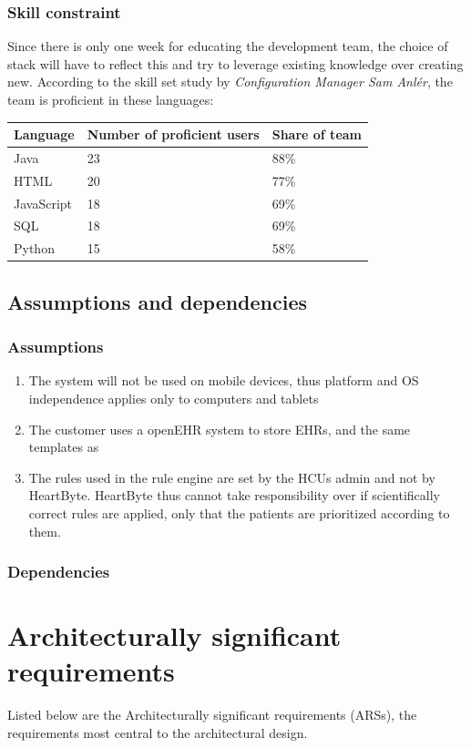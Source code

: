 \documentclass{article}
\begin{document}
\subsubsection{Skill constraint}
Since there is only one week for educating the development team, the choice of stack will have to reflect this and try to leverage existing knowledge over creating new. According to the skill set study by \emph{Configuration Manager Sam Anlér}, the team is proficient in these languages:

\begin{table}[h]
\centering
\begin{tabular}{|l|l|l|}
\hline
Language & Number of proficient users & Share of team \\ \hline
Java & 23 & 88\% \\
HTML & 20 & 77\% \\ 
JavaScript & 18 & 69\% \\ 
SQL & 18 & 69\% \\ 
Python & 15 & 58\% \\ 
\hline
\end{tabular}
\end{table}



\subsection{Assumptions and dependencies}
\subsubsection{Assumptions}
\begin{enumerate}[label=(\roman*)]
\item The system will not be used on mobile devices, thus platform and OS independence applies only to computers and tablets 
\item The customer uses a openEHR system to store EHRs, and the same templates as 
\item The rules used in the rule engine are set by the HCUs admin and not by HeartByte. HeartByte thus cannot take responsibility over if scientifically correct rules are applied, only that the patients are prioritized according to them.
\end{enumerate}
\subsubsection{Dependencies}


\section{Architecturally significant requirements}
Listed below are the Architecturally significant requirements (ARSs), the requirements most central to the architectural design. 
\end{document}
